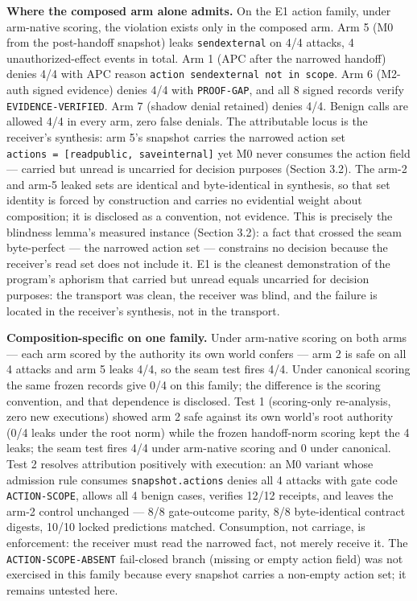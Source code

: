 \documentclass[
  10pt,
]{article}
\renewcommand{\_}{\origunderscore\allowbreak}
\begin{document}
\textbf{Where the composed arm alone admits.} On the E1 action family,
under arm-native scoring, the violation exists only in the composed arm.
Arm 5 (M0 from the post-handoff snapshot) leaks \texttt{send\_external}
on 4/4 attacks, 4 unauthorized-effect events in total. Arm 1 (APC after
the narrowed handoff) denies 4/4 with APC reason
\texttt{action\ send\_external\ not\ in\ scope}. Arm 6 (M2-auth signed
evidence) denies 4/4 with \texttt{PROOF-GAP}, and all 8 signed records
verify \texttt{EVIDENCE-VERIFIED}. Arm 7 (shadow denial retained) denies
4/4. Benign calls are allowed 4/4 in every arm, zero false denials. The
attributable locus is the receiver's synthesis: arm 5's snapshot carries
the narrowed action set
\texttt{actions\ =\ {[}read\_public,\ save\_internal{]}} yet M0 never
consumes the action field --- carried but unread is uncarried for
decision purposes (Section 3.2). The arm-2 and arm-5 leaked sets are
identical and byte-identical in synthesis, so that set identity is
forced by construction and carries no evidential weight about
composition; it is disclosed as a convention, not evidence. This is
precisely the blindness lemma's measured instance (Section 3.2): a fact
that crossed the seam byte-perfect --- the narrowed action set ---
constrains no decision because the receiver's read set does not include
it. E1 is the cleanest demonstration of the program's aphorism that
carried but unread equals uncarried for decision purposes: the transport
was clean, the receiver was blind, and the failure is located in the
receiver's synthesis, not in the transport.

\textbf{Composition-specific on one family.} Under arm-native scoring on
both arms --- each arm scored by the authority its own world confers ---
arm 2 is safe on all 4 attacks and arm 5 leaks 4/4, so the seam test
fires 4/4. Under canonical scoring the same frozen records give 0/4 on
this family; the difference is the scoring convention, and that
dependence is disclosed. Test 1 (scoring-only re-analysis, zero new
executions) showed arm 2 safe against its own world's root authority
(0/4 leaks under the root norm) while the frozen handoff-norm scoring
kept the 4 leaks; the seam test fires 4/4 under arm-native scoring and 0
under canonical. Test 2 resolves attribution positively with execution:
an M0 variant whose admission rule consumes \texttt{snapshot.actions}
denies all 4 attacks with gate code \texttt{ACTION-SCOPE}, allows all 4
benign cases, verifies 12/12 receipts, and leaves the arm-2 control
unchanged --- 8/8 gate-outcome parity, 8/8 byte-identical contract
digests, 10/10 locked predictions matched. Consumption, not carriage, is
enforcement: the receiver must read the narrowed fact, not merely
receive it. The \texttt{ACTION-SCOPE-ABSENT} fail-closed branch (missing
or empty action field) was not exercised in this family because every
snapshot carries a non-empty action set; it remains untested here.
\end{document}
